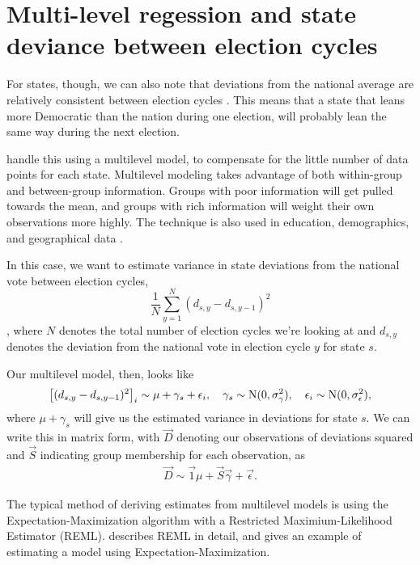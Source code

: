 \documentclass[thesis.tex]{subfiles}
\begin{document}
\section{Multi-level regession and state deviance between election cycles}

For states, though, we can also note that deviations from the national average are relatively consistent between election cycles \cite{Lock:2010aa}. This means that a state that leans more Democratic than the nation during one election, will probably lean the same way during the next election.

\cite{Lock:2010aa} handle this using a multilevel model, to compensate for the little number of data points for each state. Multilevel modeling takes advantage of both within-group and between-group information. Groups with poor information will get pulled towards the mean, and groups with rich information will weight their own observations more highly. The technique is also used in education, demographics, and geographical data \citep{Ghitza:2013aa,Gelman:2006aa,Aitkin:1981aa}.

In this case, we want to estimate variance in state deviations from the national vote between election cycles, \[
	\frac{1}{N}\sum_{y=1}^N (d_{s, y} - d_{s, y - 1})^2
\], where \(N\) denotes the total number of election cycles we're looking at and \(d_{s, y}\) denotes the deviation from the national vote in election cycle \(y\) for state \(s\).

Our multilevel model, then, looks like \begin{equation}
	\left[(d_{s, y} - d_{s, y - 1})^2\right]_i \sim \mu + \gamma_s + \epsilon_i, \quad
	\gamma_s \sim \operatorname{N}(0, \sigma_\gamma^2), \quad
	\epsilon_i \sim \operatorname{N}(0, \sigma_\epsilon^2),
\end{equation} where \(\mu + \gamma_s\) will give us the estimated variance in deviations for state \(s\). We can write this in matrix form, with \(\vec{D}\) denoting our observations of deviations squared and \(\vec{S}\) indicating group membership for each observation, as \begin{align}
	\vec{D} \sim \vec{1}\mu + \vec{S}\vec{\gamma} + \vec{\epsilon}.
\end{align}

The typical method of deriving estimates from multilevel models is using the Expectation-Maximization algorithm with a Restricted Maximium-Likelihood Estimator (REML). \cite{Harville:1977aa} describes REML in detail, and \cite{Aitkin:1981aa} gives an example of estimating a model using Expectation-Maximization.
\end{document}
